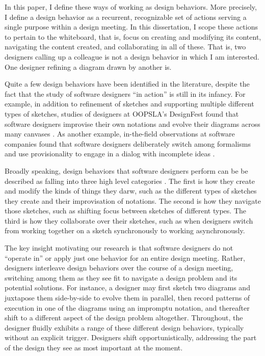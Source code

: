 In this paper, I define these ways of working as design behaviors. More precisely, I define a design behavior as a recurrent, recognizable set of actions serving a single purpose within a design meeting. In this dissertation, I scope these actions to pertain to the whiteboard, that is, focus on creating and modifying its content, navigating the content created, and collaborating in all of these. That is, two designers calling up a colleague is not a design behavior in which I am interested.  One designer refining a diagram drawn by another is.

Quite a few design behaviors have been identified in the literature, despite the fact that the study of software designers ``in action'' is still in its infancy. For example, in addition to refinement of sketches and supporting multiple different types of sketches, studies of designers at OOPSLA’s DesignFest found that software designers improvise their own notations and evolve their diagrams across many canvases \cite{dekel2007notation}. As another example, in-the-field observations at software companies found that software designers deliberately switch among formalisms and use provisionality to engage in a dialog with incomplete ideas \cite{petre2009insights}. 

Broadly speaking, design behaviors that software designers perform can be be described as falling into three high level categories . The  first is how they create and modify the kinds of things they darw, such as the different types of sketches they create and their improvisation of notations. The second is how they navigate those sketches, such as shifting focus between sketches of different types. The third is how they collaborate over their sketches, such as when designers switch from working together on a sketch synchronously to working asynchronously. 

The key insight motivating our research is that software designers do not ``operate in'' or apply just one behavior for an entire design meeting. Rather, designers interleave design behaviors over the course of a design meeting, switching among them as they see fit to navigate a design problem and its potential solutions. For instance, a designer may first sketch two diagrams and juxtapose them side-by-side to evolve them in parallel, then record patterns of execution in one of the diagrams using an impromptu notation, and thereafter shift to a different aspect of the design problem altogether. Throughout, the designer fluidly exhibits a range of these different design behaviors, typically without an explicit trigger. Designers shift opportunistically, addressing the part of the design they see as most important at the moment.

